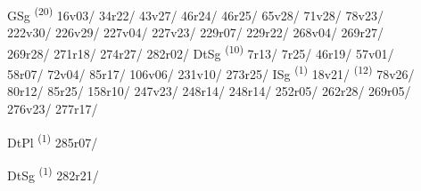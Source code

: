 \noindent{} \LEMMALINE
\begin{description}
    \item[] GSg \textsuperscript{(20)} \mbox{16v03/} \mbox{34r22/} \mbox{43v27/} \mbox{46r24/} \mbox{46r25/} \mbox{65v28/} \mbox{71v28/} \mbox{78v23/} \mbox{222v30/} \mbox{226v29/} \mbox{227v04/} \mbox{227v23/} \mbox{229r07/} \mbox{229r22/} \mbox{268v04/} \mbox{269r27/} \mbox{269r28/} \mbox{271r18/} \mbox{274r27/} \mbox{282r02/} \CASEBREAK DtSg \textsuperscript{(10)} \mbox{7r13/} \mbox{7r25/} \mbox{46r19/} \mbox{57v01/} \mbox{58r07/} \mbox{72v04/} \mbox{85r17/} \mbox{106v06/} \mbox{231v10/} \mbox{273r25/} \CASEBREAK ISg \textsuperscript{(1)} \mbox{18v21/} \textsuperscript{(12)} \mbox{78v26/} \mbox{80r12/} \mbox{85r25/} \mbox{158r10/} \mbox{247v23/} \mbox{248r14/} \mbox{248r14/} \mbox{252r05/} \mbox{262r28/} \mbox{269r05/} \mbox{276v23/} \mbox{277r17/}
    \item[] DtPl \textsuperscript{(1)} \mbox{285r07/}
\end{description}
\ENTRYEND

\noindent{} \LEMMALINE
\begin{description}
    \item[] DtSg \textsuperscript{(1)} \mbox{282r21/}
\end{description}
\ENTRYEND

